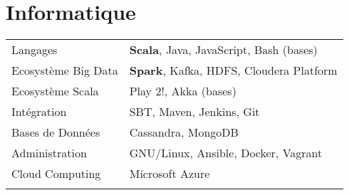 \documentclass[11pt,a4paper]{moderncv}
\begin{document}
\section{Informatique}
\begin{tabular}{ll}
  \vspace{0.1cm}
  \hspace{0.1cm} Langages & \hspace{0.5cm} \textbf{Scala}, Java, JavaScript, Bash (bases) \\ \vspace{0.1cm}
  \hspace{0.1cm} Ecosystème Big Data & \hspace{0.5cm} \textbf{Spark}, Kafka, HDFS, Cloudera Platform \\ \vspace{0.1cm}
  \hspace{0.1cm} Ecosystème Scala & \hspace{0.5cm} Play 2!, Akka (bases) \\ \vspace{0.1cm}
  \hspace{0.1cm} Intégration & \hspace{0.5cm} SBT, Maven, Jenkins, Git \\ \vspace{0.1cm}
  \hspace{0.1cm} Bases de Données & \hspace{0.5cm} Cassandra, MongoDB \\ \vspace{0.1cm}
  \hspace{0.1cm} Administration & \hspace{0.5cm} GNU/Linux, Ansible, Docker, Vagrant \\ \vspace{0.1cm}
	\hspace{0.1cm} Cloud Computing & \hspace{0.5cm} Microsoft Azure \\ \vspace{0.1cm}
\end{tabular}



\newpage
\end{document}
